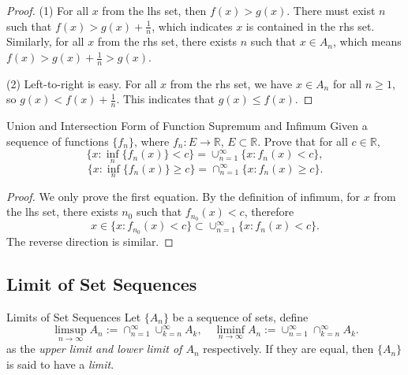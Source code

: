 \begin{proof}
  (1) For all $x$ from the lhs set,
  then $f(x) > g(x)$. There must exist $n$ such that $f(x) > g(x) + \frac{1}{n}$,
  which indicates $x$ is contained in the rhs set.
  Similarly, for all $x$ from the rhs set, there exists $n$ such that $x \in A_n$,
  which means $f(x) > g(x) + \frac{1}{n} > g(x)$.

  (2) Left-to-right is easy. For all $x$ from the rhs set,
  we have $x \in A_n$ for all $n \geq 1$, so $g(x) < f(x) + \frac{1}{n}$.
  This indicates that $g(x) \leq f(x)$.
\end{proof}

\begin{example}{Union and Intersection Form of Function Supremum and Infimum}{}
  Given a sequence of functions $\{f_n\}$, where $f_n: E \rightarrow \mathbb{R}$,
  $E \subset \mathbb{R}$. Prove that for all $c \in \mathbb{R}$,
  \begin{equation}
    \{x: \inf_n \{f_n(x)\} < c\} = \cup _{n = 1}^{\infty} \{x: f_n(x) < c\},
  \end{equation}
  \begin{equation}
    \{x: \inf_n \{f_n(x)\} \geq c\} = \cap _{n = 1}^{\infty} \{x: f_n(x) \geq c\}.
  \end{equation}
\end{example}

\begin{proof}
  We only prove the first equation.
  By the definition of infimum, for $x$ from the lhs set,
  there exists $n_0$ such that $f_{n_0}(x) < c$,
  therefore
  \begin{equation}
    x \in \{x: f_{n_0}(x) < c\} \subset \cup _{n = 1}^{\infty} \{x: f_n(x) < c\}.
  \end{equation}
  The reverse direction is similar.
\end{proof}

\subsection{Limit of Set Sequences}

\begin{definition}{Limits of Set Sequences}{}
  Let $\{A_n\}$ be a sequence of sets,
  define
  \begin{equation}
    \limsup \limits_{n \rightarrow \infty} A_n := \cap _{n = 1}^{\infty}
    \cup _{k = n} ^{\infty} A_k, \quad
    \liminf \limits_{n \rightarrow \infty} A_n := \cup _{n = 1}^{\infty}
    \cap _{k = n}^{\infty}A_k.
  \end{equation}
  as the \emph{upper limit and lower limit of $A_n$} respectively.
  If they are equal, then $\{A_n\}$ is said to have a \emph{limit}.
\end{definition}


